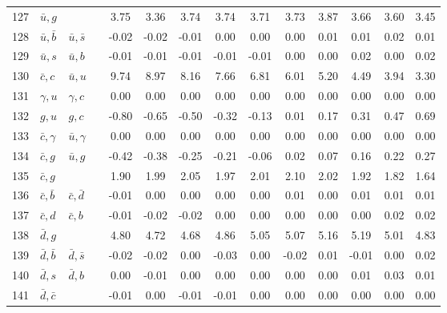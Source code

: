 \begin{tabularx}{\textwidth}{rXXX@{}S@{}S@{}S@{}S@{}S@{}S@{}S@{}S@{}S@{}S}
127 & $\bar u, g$      &                   &                  &  3.75 &  3.36 &  3.74 &  3.74 &  3.71 &  3.73 &  3.87 &  3.66 &  3.60 &  3.45 \\
128 & $\bar u, \bar b$ & $\bar u, \bar s$  &                  & -0.02 & -0.02 & -0.01 &  0.00 &  0.00 &  0.00 &  0.01 &  0.01 &  0.02 &  0.01 \\
129 & $\bar u, s$      & $\bar u, b$       &                  & -0.01 & -0.01 & -0.01 & -0.01 & -0.01 &  0.00 &  0.00 &  0.02 &  0.00 &  0.02 \\
130 & $\bar c, c$      & $\bar u, u$       &                  &  9.74 &  8.97 &  8.16 &  7.66 &  6.81 &  6.01 &  5.20 &  4.49 &  3.94 &  3.30 \\
131 & $\gamma, u$      & $\gamma, c$       &                  &  0.00 &  0.00 &  0.00 &  0.00 &  0.00 &  0.00 &  0.00 &  0.00 &  0.00 &  0.00 \\
132 & $g, u$           & $g,  c$           &                  & -0.80 & -0.65 & -0.50 & -0.32 & -0.13 &  0.01 &  0.17 &  0.31 &  0.47 &  0.69 \\
133 & $\bar c, \gamma$ & $\bar u, \gamma$  &                  &  0.00 &  0.00 &  0.00 &  0.00 &  0.00 &  0.00 &  0.00 &  0.00 &  0.00 &  0.00 \\
134 & $\bar c, g$      & $\bar u, g$       &                  & -0.42 & -0.38 & -0.25 & -0.21 & -0.06 &  0.02 &  0.07 &  0.16 &  0.22 &  0.27 \\
135 & $\bar c, g$      &                   &                  &  1.90 &  1.99 &  2.05 &  1.97 &  2.01 &  2.10 &  2.02 &  1.92 &  1.82 &  1.64 \\
136 & $\bar c, \bar b$ & $\bar c, \bar d$  &                  & -0.01 &  0.00 &  0.00 &  0.00 &  0.00 &  0.01 &  0.00 &  0.01 &  0.01 &  0.01 \\
137 & $\bar c, d$      & $\bar c, b$       &                  & -0.01 & -0.02 & -0.02 &  0.00 &  0.00 &  0.00 &  0.00 &  0.00 &  0.02 &  0.02 \\
138 & $\bar d, g$      &                   &                  &  4.80 &  4.72 &  4.68 &  4.86 &  5.05 &  5.07 &  5.16 &  5.19 &  5.01 &  4.83 \\
139 & $\bar d, \bar b$ & $\bar d, \bar s$  &                  & -0.02 & -0.02 &  0.00 & -0.03 &  0.00 & -0.02 &  0.01 & -0.01 &  0.00 &  0.02 \\
140 & $\bar d, s$      & $\bar d, b$       &                  &  0.00 & -0.01 &  0.00 &  0.00 &  0.00 &  0.00 &  0.00 &  0.01 &  0.03 &  0.01 \\
141 & $\bar d, \bar c$ &                   &                  & -0.01 &  0.00 & -0.01 & -0.01 &  0.00 &  0.00 &  0.00 &  0.00 &  0.00 &  0.00 \\

\end{tabularx}
